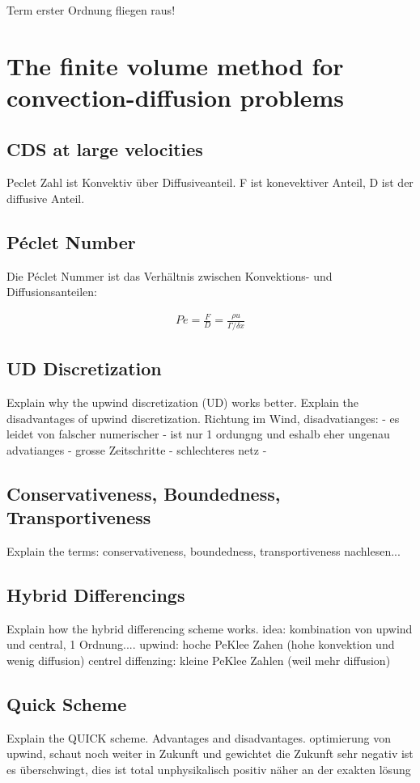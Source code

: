 \documentclass[a4paper]{scrartcl}
\begin{document}
Term erster Ordnung fliegen raus!
\section{The finite volume method for convection-diffusion problems}
\subsection{CDS at large velocities}
Peclet Zahl ist Konvektiv über Diffusiveanteil. F ist konevektiver Anteil, D
ist der diffusive Anteil.
\subsection{Péclet Number}
Die Péclet Nummer ist das Verhältnis zwischen Konvektions- und
Diffusionsanteilen:

\begin{align}
Pe=\frac{F}{D} = \frac{\rho u}{\Gamma / \delta x}
\end{align}
\subsection{UD Discretization}
Explain why the upwind discretization (UD) works better. Explain the disadvantages of upwind discretization.
Richtung im Wind, 
disadvatianges:
- es leidet von falscher numerischer
- ist nur 1 ordungng und eshalb eher ungenau
advatianges
- grosse Zeitschritte
- schlechteres netz
- 



\subsection{Conservativeness, Boundedness, Transportiveness} Explain the terms:
conservativeness, boundedness, transportiveness nachlesen...



\subsection{Hybrid Differencings} Explain how the hybrid differencing scheme
works.
idea: kombination von upwind und central, 1 Ordnung....
upwind: hoche PeKlee Zahen (hohe konvektion und wenig diffusion)
centrel diffenzing: kleine PeKlee Zahlen (weil mehr diffusion)

\subsection{Quick Scheme} Explain the QUICK scheme. Advantages and
disadvantages.
optimierung von upwind, schaut noch weiter in Zukunft und gewichtet die Zukunft
sehr negativ ist es überschwingt, dies ist total unphysikalisch
positiv näher an der exakten lösung
\end{document}
